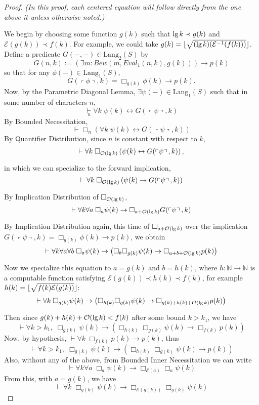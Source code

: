 \documentclass[onecolumn]{miri-tech-article}
\DeclarePairedDelimiter\floor{\lfloor}{\rfloor}
\numberwithin{equation}{section}
\newcommand{\eqn}[1]{\begin{equation}#1\end{equation}}
\theoremstyle{definition}
\newcommand{\NN}{\mathbb{N}}
\newcommand{\Ee}{\mathcal{E}}
\newcommand{\Oo}{\mathcal{O}}
\newcommand{\proves}[1]{\underset{#1}{\vdash}}
\newcommand{\bx}[1]{\Box_{#1}}
\newcommand{\Lang}{\mathrm{Lang}}
\renewcommand{\implies}{\rightarrow}
\renewcommand{\to}{\rightarrow}
\renewcommand{\iff}{\leftrightarrow}
\newcommand{\qquote}[1]{\left\ulcorner #1 \right\urcorner}
\renewcommand{\lg}{\mathrm{lg\hspace{0.3ex}}}
\renewcommand{\-}{^{-1}}
\begin{document}
\begin{proof}
{\em (In this proof, each centered equation will follow directly from the one above it unless otherwise noted.)}

We begin by choosing some function $g(k)$ such that $\lg k \prec g(k)$ and $\Ee(g(k)) \prec f(k)$.  For example, we could take $g(k) = \floor{\sqrt{(\lg k)(\Ee\- (f(k)))}}$.  Define a predicate $G(-,-)\in\Lang_2(S)$ by
$$G(n,k) := \left(\exists m : Bew(m,Eval_1(n,k),g(k))\right) \implies p(k)$$
so that for any $\phi(-)\in\Lang_1(S)$,
%
$$G(\qquote\phi,k) = \bx{g(k)}\phi(k) \implies p(k).$$
%
Now, by the Parametric Diagonal Lemma, $\exists \psi(-)\in\Lang_1(S)$ such that in some number of characters $n$,
\eqn{\label{eqn1}
\proves{n} \forall k \; \psi(k) \iff G(\qquote\psi,k)
}
By Bounded Necessitation,
$$\proves{} \bx{n} \left(\forall k \; \psi(k) \iff G(\qquote\psi,k)\right)$$
By Quantifier Distribution, since $n$ is constant with respect to $k$,
$$\proves{} \forall k \; \bx{\Oo(\lg k)} \left(\psi(k) \iff G(\qquote\psi,k)\right),$$
in which we can specialize to the forward implication,
$$\proves{} \forall k \; \bx{\Oo(\lg k)} \left(\psi(k) \implies G(\qquote\psi,k)\right)$$
By Implication Distribution of $\bx{\Oo(\lg k)}$,
$$\proves{} \forall k \forall a \; \bx{a}\psi(k) \implies \bx{a+\Oo(\lg k)}G(\qquote\psi,k)$$
By Implication Distribution again, this time of $\bx{a+\Oo(\lg k)}$ over the implication $G(\qquote\psi,k) = \bx{g(k)}\phi(k) \implies p(k)$, we obtain
$$\proves{} \forall k \forall a \forall b \; \bx{a}\psi(k) \implies 
\left(\bx{b}\bx{g(k)}\psi(k) \implies \bx{a+b+\Oo(\lg k)}p(k)\right)$$
Now we specialize this equation to $a=g(k)$ and $b=h(k)$, where $h:\NN\to\NN$ is a computable function satisfying $\Ee (g(k))\prec h(k)\prec f(k)$, for example $h(k) = \floor{\sqrt{f(k)\Ee (g(k))}}$:
$$\proves{} \forall k \; \bx{g(k)} \psi(k) \implies 
\left(\bx{h(k)}\bx{g(k)}\psi(k) \implies \bx{g(k)+h(k)+\Oo(\lg k)} p(k)\right)$$
Then since $g(k)+h(k)+\Oo(\lg k) < f(k)$ after some bound $k > k_1$, we have
$$\proves{} \forall k>k_1, \; \bx{g(k)}\psi(k) \implies \left(\bx{h(k)}\bx{g(k)}\psi(k) \implies \bx{f(k)} p(k)\right)$$
Now, by hypothesis, $\proves{} \forall k\; \bx{f(k)}p(k)\implies p(k)$, thus
\eqn{\label{eqn9}
\proves{} \forall k>k_1, \; \bx{g(k)}\psi(k) \implies \left(\bx{h(k)}\bx{g(k)}\psi(k) \implies p(k)\right)
}
Also, without any of the above, from Bounded Inner Necessitation we can write
$$\proves{} \forall k \forall a \; \bx{a}\psi(k)\implies \bx{\Ee(a)}\bx{a}\psi(k)$$
From this, with $a=g(k)$, we have
$$\proves{} \forall k \; \bx{g(k)}\psi(k)\implies \bx{\Ee(g(k))}\bx{g(k)}\psi(k)$$

\end{proof}
\end{document}
